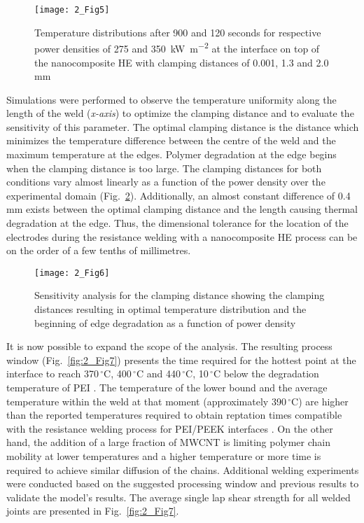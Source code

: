 \begin{figure}[ht]
	\center
	\texttt{[image: 2\_Fig5]}
	\caption{Temperature distributions after 900 and 120 seconds for respective power densities of 275 and \SI{350}{\kilo\watt\per\square\metre} at the interface on top of the nanocomposite HE with clamping distances of 0.001, 1.3 and 2.0 mm \cite{Brassard2019b}}
	\label{fig:2_Fig5}
\end{figure} 

\FloatBarrier
Simulations were performed to observe the temperature uniformity along the length of the weld (\textit{x-axis}) to optimize the clamping distance and to evaluate the sensitivity of this parameter. 
The optimal clamping distance is the distance which minimizes the temperature difference between the centre of the weld and the maximum temperature at the edges. 
Polymer degradation at the edge begins when the clamping distance is too large. 
The clamping distances for both conditions vary almost linearly as a function of the power density over the experimental domain (\mbox{Fig. \ref{fig:2_Fig6}}). 
Additionally, an almost constant difference of \mbox{0.4\,mm} exists between the optimal clamping distance and the length causing thermal degradation at the edge. 
Thus, the dimensional tolerance for the location of the electrodes during the resistance welding with a nanocomposite HE process can be on the order of a few tenths of millimetres. 

\begin{figure}[ht]
	\center
	\texttt{[image: 2\_Fig6]}
	\caption{Sensitivity analysis for the clamping distance showing the clamping distances resulting in optimal temperature distribution and the beginning of edge degradation as a function of power density \cite{Brassard2019b}}
	\label{fig:2_Fig6}
\end{figure} 

It is now possible to expand the scope of the analysis. 
The resulting process window (\mbox{Fig. \ref{fig:2_Fig7}}) presents the time required for the hottest point at the interface to reach \mbox{370\,$^{\circ}$C}, \mbox{400\,$^{\circ}$C} and \mbox{440\,$^{\circ}$C}, \mbox{10\,$^{\circ}$C} below the degradation temperature of PEI \cite{Carroccio2000}. 
The temperature of the lower bound and the average temperature within the weld at that moment (approximately \mbox{390\,$^{\circ}$C}) are higher than the reported temperatures required to obtain reptation times compatible with the resistance welding process for PEI/PEEK interfaces \cite{Bastien1991}. 
On the other hand, the addition of a large fraction of MWCNT is limiting polymer chain mobility at lower temperatures \cite{Mu2009,Kabanemi2010} and a higher temperature or more time is required to achieve similar diffusion of the chains. 
Additional welding experiments were conducted based on the suggested processing window and previous results to validate the model’s results. 
The average single lap shear strength for all welded joints are presented in \mbox{Fig. \ref{fig:2_Fig7}}.  

